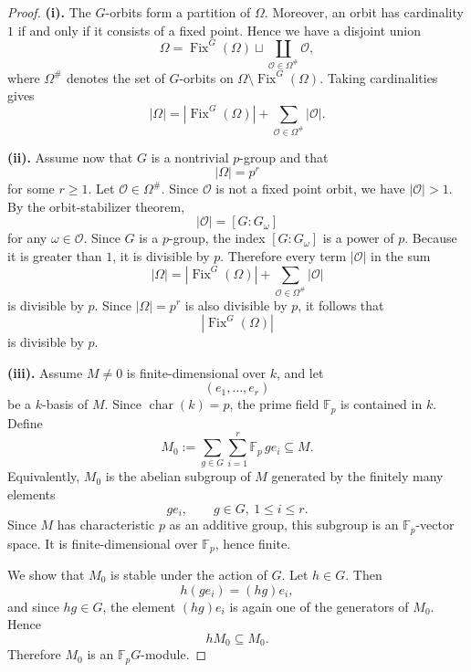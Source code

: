 \begin{proof}
    \textbf{(i).}
    The \(G\)-orbits form a partition of \(\Omega\). Moreover, an orbit has
    cardinality \(1\) if and only if it consists of a fixed point. Hence we have a
    disjoint union
    \[
        \Omega
        =
        \operatorname{Fix}^G(\Omega)
        \sqcup
        \coprod_{\mathcal{O}\in \Omega^\#} \mathcal{O},
    \]
    where \(\Omega^\#\) denotes the set of \(G\)-orbits on
    \(\Omega\setminus \operatorname{Fix}^G(\Omega)\). Taking cardinalities gives
    \[
        |\Omega|
        =
        |\operatorname{Fix}^G(\Omega)|
        +
        \sum_{\mathcal{O}\in \Omega^\#} |\mathcal{O}|.
    \]

    \textbf{(ii).}
    Assume now that \(G\) is a nontrivial \(p\)-group and that
    \[
        |\Omega|=p^r
    \]
    for some \(r\geq 1\). Let \(\mathcal{O}\in \Omega^\#\). Since \(\mathcal{O}\)
    is not a fixed point orbit, we have \(|\mathcal{O}|>1\). By the orbit-stabilizer
    theorem,
    \[
        |\mathcal{O}|=[G:G_\omega]
    \]
    for any \(\omega\in \mathcal{O}\). Since \(G\) is a \(p\)-group, the index
    \([G:G_\omega]\) is a power of \(p\). Because it is greater than \(1\), it is
    divisible by \(p\). Therefore every term \(|\mathcal{O}|\) in the sum
    \[
        |\Omega|
        =
        |\operatorname{Fix}^G(\Omega)|
        +
        \sum_{\mathcal{O}\in \Omega^\#} |\mathcal{O}|
    \]
    is divisible by \(p\). Since \(|\Omega|=p^r\) is also divisible by \(p\), it follows
    that
    \[
        |\operatorname{Fix}^G(\Omega)|
    \]
    is divisible by \(p\).

    \textbf{(iii).}
    Assume \(M\neq 0\) is finite-dimensional over \(k\), and let
    \[
        (e_1,\dots,e_r)
    \]
    be a \(k\)-basis of \(M\). Since \(\operatorname{char}(k)=p\), the prime field
    \(\mathbb{F}_p\) is contained in \(k\). Define
    \[
        M_0
        :=
        \sum_{g\in G}\sum_{i=1}^r \mathbb{F}_p\, ge_i
        \subseteq M.
    \]
    Equivalently, \(M_0\) is the abelian subgroup of \(M\) generated by the finitely
    many elements
    \[
        ge_i,
        \qquad g\in G,\ 1\leq i\leq r.
    \]
    Since \(M\) has characteristic \(p\) as an additive group, this subgroup is an
    \(\mathbb{F}_p\)-vector space. It is finite-dimensional over \(\mathbb{F}_p\), hence
    finite.

    We show that \(M_0\) is stable under the action of \(G\). Let \(h\in G\). Then
    \[
        h(ge_i)=(hg)e_i,
    \]
    and since \(hg\in G\), the element \((hg)e_i\) is again one of the generators of
    \(M_0\). Hence
    \[
        hM_0\subseteq M_0.
    \]
    Therefore \(M_0\) is an \(\mathbb{F}_pG\)-module.


\end{proof}
